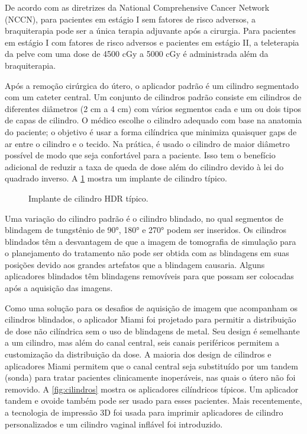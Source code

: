 \documentclass[11pt,a4paper]{article}
\begin{document}
	De acordo com as diretrizes da National Comprehensive Cancer Network (NCCN), para pacientes em estágio I sem fatores de risco adversos, a braquiterapia pode ser a única terapia adjuvante após a cirurgia. Para pacientes em estágio I com fatores de risco adversos e pacientes em estágio II, a teleterapia da pelve com uma dose de 4500 cGy a 5000 cGy é administrada além da braquiterapia.

	Após a remoção cirúrgica do útero, o aplicador padrão é um cilindro segmentado com um cateter central. Um conjunto de cilindros padrão consiste em cilindros de diferentes diâmetros (2 cm a 4 cm) com vários segmentos cada e um ou dois tipos de capas de cilindro. O médico escolhe o cilindro adequado com base na anatomia do paciente; o objetivo é usar a forma cilíndrica que minimiza quaisquer gaps de ar entre o cilindro e o tecido. Na prática, é usado o cilindro de maior diâmetro possível de modo que seja confortável para a paciente. Isso tem o benefício adicional de reduzir a taxa de queda de dose além do cilindro devido à lei do quadrado inverso. A \ref{fig:implanteCilindro} mostra um implante de cilindro típico.

	\begin{figure}[h]
		\centering
		\caption{Implante de cilindro HDR típico.}
		\label{fig:implanteCilindro}
	\end{figure}

	Uma variação do cilindro padrão é o cilindro blindado, no qual segmentos de blindagem de tungstênio de \ang{90}, \ang{180} e \ang{270} podem ser inseridos. Os cilindros blindados têm a desvantagem de que a imagem de tomografia de simulação para o planejamento do tratamento não pode ser obtida com as blindagens em suas posições devido aos grandes artefatos que a blindagem causaria. Alguns aplicadores blindados têm blindagens removíveis para que possam ser colocadas após a aquisição das imagens. 
	
	Como uma solução para os desafios de aquisição de imagem que acompanham os cilindros blindados, o aplicador Miami foi projetado para permitir a distribuição de dose não cilíndrica sem o uso de blindagens de metal. Seu design é semelhante a um cilindro, mas além do canal central, seis canais periféricos permitem a customização da distribuição da dose. A maioria dos design de cilindros e aplicadores Miami permitem que o canal central seja substituído por um tandem (sonda) para tratar pacientes clinicamente inoperáveis, nas quais o útero não foi removido. A \ref{fig:cilindros} mostra os aplicadores cilíndricos típicos. Um aplicador tandem e ovoide também pode ser usado para esses pacientes. Mais recentemente, a tecnologia de impressão 3D foi usada para imprimir aplicadores de cilindro personalizados e um cilindro vaginal inflável foi introduzido.
	
\end{document}

